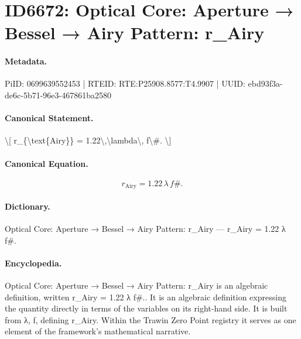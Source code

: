 \section*{ID6672: Optical Core: Aperture → Bessel → Airy Pattern: r\_Airy}
\paragraph{Metadata.}
PiID: 0699639552453 | RTEID: RTE:P25908.8577:T4.9907 | UUID: ebd93f3a-de6c-5b71-96e3-467861ba2580

\paragraph{Canonical Statement.}
\textbackslash{}[ r\_\{\textbackslash{}text\{Airy\}\} = 1.22\textbackslash{},\textbackslash{}lambda\textbackslash{}, f\textbackslash{}\#. \textbackslash{}]

\paragraph{Canonical Equation.}
\[
r_{\text{Airy}} = 1.22\,\lambda\, f\#.
\]

\paragraph{Dictionary.}
Optical Core: Aperture → Bessel → Airy Pattern: r\_Airy — r\_Airy = 1.22 λ f\#.

\paragraph{Encyclopedia.}
Optical Core: Aperture → Bessel → Airy Pattern: r\_Airy is an algebraic definition, written r\_Airy = 1.22 λ f\#.. It is an algebraic definition expressing the quantity directly in terms of the variables on its right-hand side. It is built from λ, f, defining r\_Airy. Within the Trawin Zero Point registry it serves as one element of the framework's mathematical narrative.
